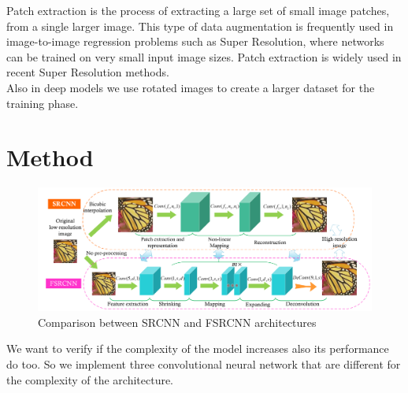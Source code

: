 \documentclass[10pt,twocolumn,letterpaper]{article}
\begin{document}
Patch extraction is the process of extracting a large set of small image patches,  from a single larger image. This type of data augmentation is frequently used in image-to-image regression problems such as Super Resolution, where networks can be trained on very small input image sizes.
Patch extraction is widely used  in recent Super Resolution methods.\\
Also in deep models we use rotated images to create a larger dataset for the training phase.\\


\section{Method}
\begin{figure}[]
	\centering
	\includegraphics[width=\textwidth]{img/fsrcnn.png}
	\caption{Comparison between SRCNN and FSRCNN architectures \cite{dong2014image}}
	\label{fsrcnn}
\end{figure}

We want to verify if the complexity of the model increases also its performance do too. So we implement three convolutional neural network that are different for the complexity of the architecture.
\end{document}
